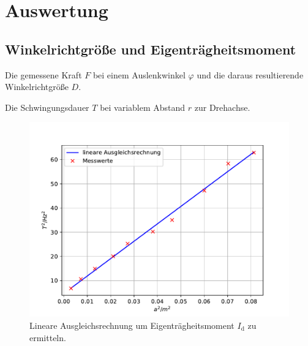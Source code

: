 \section{Auswertung}
\label{sec:Auswertung}
\subsection{Winkelrichtgröße und Eigenträgheitsmoment}
\begin{table}
    \centering
    \caption{Die gemessene Kraft $F$ bei einem Auslenkwinkel $\varphi$ und die daraus resultierende Winkelrichtgröße $D$.}
    \label{tab:kraft}  
\end{table}

\begin{table}
    \centering
    \caption{Die Schwingungsdauer $T$ bei variablem Abstand $r$ zur Drehachse.}
    \label{tab:gewichte}  
\end{table}
\begin{figure}
    \centering
    \includegraphics[width=\textwidth]{content/data/ausgleich.pdf}
    \caption{Lineare Ausgleichsrechnung um Eigenträgheitsmoment $I_\text{d}$ zu ermitteln.}
    \label{fig:ausgleich}
\end{figure}
\FloatBarrier

